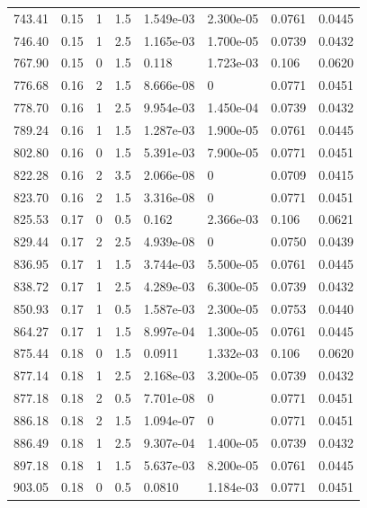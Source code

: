 \documentclass[preview]{standalone}
\begin{document}
{{{\begin{tabular}{L{1.2cm}C{1.2cm} C{0.3cm}C{0.5cm} C{1.4cm}C{1.4cm} C{1.4cm}C{1.4cm}}
  743.41  &  0.15  & 1     & 1.5 &  1.549e-03  & 2.300e-05  & 0.0761 &  0.0445   \\ 
  746.40  &  0.15  & 1     & 2.5 &  1.165e-03  & 1.700e-05  & 0.0739 &  0.0432   \\ 
  767.90  &  0.15  & 0     & 1.5 &  0.118  & 1.723e-03  & 0.106 &  0.0620   \\ 
  776.68  &  0.16  & 2     & 1.5 &  8.666e-08  & 0  & 0.0771 &  0.0451   \\ 
  778.70  &  0.16  & 1     & 2.5 &  9.954e-03  & 1.450e-04  & 0.0739 &  0.0432   \\ 
  789.24  &  0.16  & 1     & 1.5 &  1.287e-03  & 1.900e-05  & 0.0761 &  0.0445   \\ 
  802.80  &  0.16  & 0     & 1.5 &  5.391e-03  & 7.900e-05  & 0.0771 &  0.0451   \\ 
  822.28  &  0.16  & 2     & 3.5 &  2.066e-08  & 0  & 0.0709 &  0.0415   \\ 
  823.70  &  0.16  & 2     & 1.5 &  3.316e-08  & 0  & 0.0771 &  0.0451   \\ 
  825.53  &  0.17  & 0     & 0.5 &  0.162  & 2.366e-03  & 0.106 &  0.0621   \\ 
  829.44  &  0.17  & 2     & 2.5 &  4.939e-08  & 0  & 0.0750 &  0.0439   \\ 
  836.95  &  0.17  & 1     & 1.5 &  3.744e-03  & 5.500e-05  & 0.0761 &  0.0445   \\ 
  838.72  &  0.17  & 1     & 2.5 &  4.289e-03  & 6.300e-05  & 0.0739 &  0.0432   \\ 
  850.93  &  0.17  & 1     & 0.5 &  1.587e-03  & 2.300e-05  & 0.0753 &  0.0440   \\ 
  864.27  &  0.17  & 1     & 1.5 &  8.997e-04  & 1.300e-05  & 0.0761 &  0.0445   \\ 
  875.44  &  0.18  & 0     & 1.5 &  0.0911  & 1.332e-03  & 0.106 &  0.0620   \\ 
  877.14  &  0.18  & 1     & 2.5 &  2.168e-03  & 3.200e-05  & 0.0739 &  0.0432   \\ 
  877.18  &  0.18  & 2     & 0.5 &  7.701e-08  & 0  & 0.0771 &  0.0451   \\ 
  886.18  &  0.18  & 2     & 1.5 &  1.094e-07  & 0  & 0.0771 &  0.0451   \\ 
  886.49  &  0.18  & 1     & 2.5 &  9.307e-04  & 1.400e-05  & 0.0739 &  0.0432   \\ 
  897.18  &  0.18  & 1     & 1.5 &  5.637e-03  & 8.200e-05  & 0.0761 &  0.0445   \\ 
  903.05  &  0.18  & 0     & 0.5 &  0.0810  & 1.184e-03  & 0.0771 &  0.0451   \\ 

\end{tabular}}}}
\end{document}
